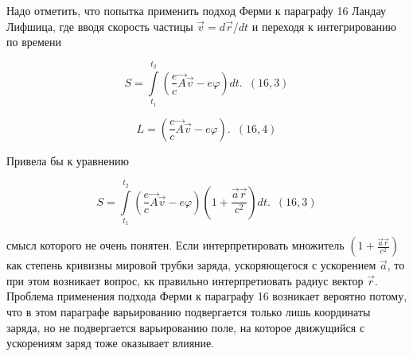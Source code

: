 \documentclass[11pt]{article}
\makeatletter
\newcommand{\boxspacing}{\kern\kvtcb@left@rule\kern\kvtcb@boxsep}
\newcommand{\prompt}[4]{
        {\ttfamily\llap{{\color{#2}[#3]:\hspace{3pt}#4}}\vspace{-\baselineskip}}
    }
\makeatother
\begin{document}
    \begin{tcolorbox}[breakable, size=fbox, boxrule=1pt, pad at break*=1mm,colback=cellbackground, colframe=cellborder]
\prompt{In}{incolor}{ }{\boxspacing}
\begin{Verbatim}[commandchars=\\\{\}]

\end{Verbatim}
\end{tcolorbox}

    Надо отметить, что попытка применить подход Ферми к параграфу 16 Ландау
Лифшица, где вводя скорость частицы \(\vec v = d \vec r /d t\) и
переходя к интегрированию по времени

    \[S = \int\limits_{t_1}^{t_2} \left(\frac{e}{c}\vec A \vec v - e \varphi \right) dt. \,\,\,  (16,3)\]

\[L = \left(\frac{e}{c}\vec A \vec v - e \varphi \right). \,\,\,  (16,4)\]

Привела бы к уравнению

\[S = \int\limits_{t_1}^{t_2} \left(\frac{e}{c}\vec A \vec v - e \varphi \right) \left(1+\frac{\vec a \vec r}{c^2}\right) dt. \,\,\,  (16,3)\]

смысл которого не очень понятен. Если интерпретировать множитель
\(\left(1+\frac{\vec a \vec r}{c^2}\right)\) как степень кривизны
мировой трубки заряда, ускоряющегося с ускорением \(\vec a\), то при
этом возникает вопрос, кк правильно интерпретиовать радиус вектор
\(\vec r\). Проблема применения подхода Ферми к параграфу 16 возникает
вероятно потому, что в этом параграфе варьированию подвергается только
лишь координаты заряда, но не подвергается варьированию поле, на которое
движущийся с ускорениям заряд тоже оказывает влияние.

    \begin{tcolorbox}[breakable, size=fbox, boxrule=1pt, pad at break*=1mm,colback=cellbackground, colframe=cellborder]
\prompt{In}{incolor}{ }{\boxspacing}
\begin{Verbatim}[commandchars=\\\{\}]

\end{Verbatim}
\end{tcolorbox}


    
    
    
\end{document}
